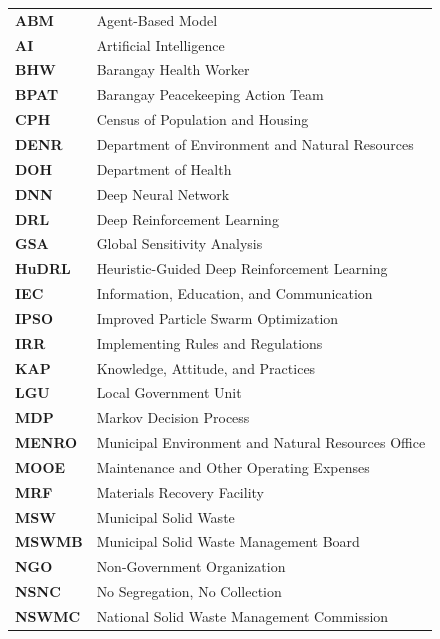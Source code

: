
\begin{longtable}{p{} p{}}
    \textbf{ABM} & Agent-Based Model \\
    \textbf{AI} & Artificial Intelligence \\
    \textbf{BHW} & Barangay Health Worker \\
    \textbf{BPAT} & Barangay Peacekeeping Action Team \\
    \textbf{CPH} & Census of Population and Housing \\
    \textbf{DENR} & Department of Environment and Natural Resources \\
    \textbf{DOH} & Department of Health \\
    \textbf{DNN} & Deep Neural Network \\
    \textbf{DRL} & Deep Reinforcement Learning \\
    \textbf{GSA} & Global Sensitivity Analysis \\
    \textbf{HuDRL} & Heuristic-Guided Deep Reinforcement Learning \\
    \textbf{IEC} & Information, Education, and Communication \\
    \textbf{IPSO} & Improved Particle Swarm Optimization \\
    \textbf{IRR} & Implementing Rules and Regulations \\
    \textbf{KAP} & Knowledge, Attitude, and Practices \\
    \textbf{LGU} & Local Government Unit \\
    \textbf{MDP} & Markov Decision Process \\
    \textbf{MENRO} & Municipal Environment and Natural Resources Office \\
    \textbf{MOOE} & Maintenance and Other Operating Expenses \\
    \textbf{MRF} & Materials Recovery Facility \\
    \textbf{MSW} & Municipal Solid Waste \\
    \textbf{MSWMB} & Municipal Solid Waste Management Board \\
    \textbf{NGO} & Non-Government Organization \\
    \textbf{NSNC} & No Segregation, No Collection \\
    \textbf{NSWMC} & National Solid Waste Management Commission \\

\end{longtable}
